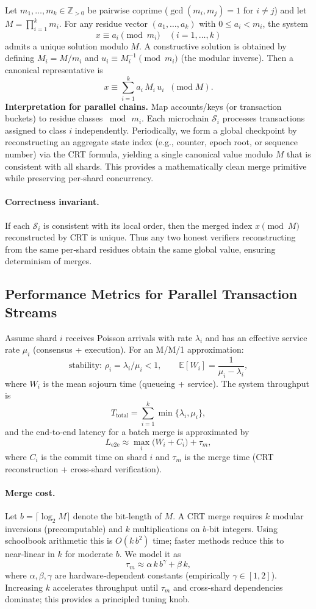 \documentclass[12pt,onecolumn]{IEEEtran} %
\begin{document}
Let $m_1,\dots,m_k\in\mathbb{Z}_{>0}$ be pairwise coprime ($\gcd(m_i,m_j)=1$ for $i\neq j$) and let $M=\prod_{i=1}^k m_i$.
For any residue vector $(a_1,\dots,a_k)$ with $0\le a_i<m_i$, the system
\[
x \equiv a_i \pmod{m_i}\quad (i=1,\dots,k)
\]
admits a unique solution modulo $M$.
A constructive solution is obtained by defining $M_i = M/m_i$ and $u_i\equiv M_i^{-1}\pmod{m_i}$ (the modular inverse).
Then a canonical representative is
\[
x \equiv \sum_{i=1}^k a_i \, M_i \, u_i \;\;(\mathrm{mod}\; M).
\]
\textbf{Interpretation for parallel chains.} Map accounts/keys (or transaction buckets) to residue classes $\bmod\,m_i$. Each microchain $\mathcal{S}_i$ processes transactions assigned to class $i$ independently. Periodically, we form a global checkpoint by reconstructing an aggregate state index (e.g., counter, epoch root, or sequence number) via the CRT formula, yielding a single canonical value modulo $M$ that is consistent with all shards. This provides a mathematically clean merge primitive while preserving per‑shard concurrency.

\paragraph{Correctness invariant.}
If each $\mathcal{S}_i$ is consistent with its local order, then the merged index $x\pmod{M}$ reconstructed by CRT is unique. Thus any two honest verifiers reconstructing from the same per‑shard residues obtain the same global value, ensuring determinism of merges.

\subsection{Performance Metrics for Parallel Transaction Streams}
\label{sec:crt-perf}

Assume shard $i$ receives Poisson arrivals with rate $\lambda_i$ and has an effective service rate $\mu_i$ (consensus + execution). For an M/M/1 approximation:
\[
\text{stability: } \rho_i=\lambda_i/\mu_i<1,\qquad \mathbb{E}[W_i] = \frac{1}{\mu_i-\lambda_i},
\]
where $W_i$ is the mean sojourn time (queueing + service). The system throughput is
\[
T_{\mathrm{total}} = \sum_{i=1}^k \min\{\lambda_i,\mu_i\},
\]
and the end‑to‑end latency for a batch merge is approximated by
\[
L_{\mathrm{e2e}} \approx \max_{i}\big(W_i + C_i\big) + \tau_m,
\]
where $C_i$ is the commit time on shard $i$ and $\tau_m$ is the merge time (CRT reconstruction + cross‑shard verification).

\paragraph{Merge cost.}
Let $b=\lceil\log_2 M\rceil$ denote the bit‑length of $M$. A CRT merge requires $k$ modular inversions (precomputable) and $k$ multiplications on $b$‑bit integers. Using schoolbook arithmetic this is $O(k\,b^2)$ time; faster methods reduce this to near‑linear in $k$ for moderate $b$. We model it as
\[
\tau_m \approx \alpha\,k\,b^{\gamma} + \beta\,k,
\]
where $\alpha,\beta,\gamma$ are hardware‑dependent constants (empirically $\gamma\in[1,2]$). Increasing $k$ accelerates throughput until $\tau_m$ and cross‑shard dependencies dominate; this provides a principled tuning knob.
\end{document}
